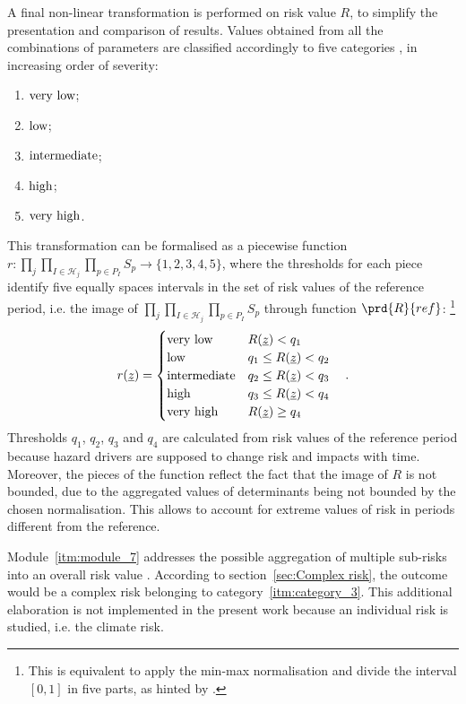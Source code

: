 A final non-linear transformation is performed on \gls{risk} value $R$, to simplify the presentation and comparison of results.
Values obtained from all the combinations of parameters are classified accordingly to five categories \cite[53]{2017GIZRiskSupplement}, in increasing order of severity:
\begin{enumerate}
  \item $\text{very low}$;
  \item $\text{low}$;
  \item $\text{intermediate}$;
  \item $\text{high}$;
  \item $\text{very high}$.
\end{enumerate}
This transformation can be formalised as a piecewise function $r : \prod_j \prod_{I \in \mathcal{H}_j} \prod_{p \in P_I} S_p \to \{ 1, 2, 3, 4, 5 \}$, where the thresholds for each piece identify five equally spaces intervals in the set of risk values of the reference period, i.e. the image of $\prod_j \prod_{I \in \mathcal{H}_j} \prod_{p \in P_I} S_p$ through function $\prd{R}{ref}$:%
\footnote{This is equivalent to apply the min-max normalisation and divide the interval $[0, 1]$ in five parts, as hinted by \cite[74]{2017GIZVulnerabilitySourcebook}.}
\begin{equation}
  \label{eq:risk_categorical}
  r(\underline{z}) =
  \begin{cases}
    \text{very low} & R(\underline{z}) < q_1 \\
    \text{low} & q_1 \le R(\underline{z}) < q_2 \\
    \text{intermediate} & q_2 \le R(\underline{z}) < q_3 \\
    \text{high} & q_3 \le R(\underline{z}) < q_4 \\
    \text{very high} & R(\underline{z}) \ge q_4
  \end{cases}
  \quad .
\end{equation}
Thresholds $q_1$, $q_2$, $q_3$ and $q_4$ are calculated from risk values of the reference period because \gls{hazard} \glspl{driver} are supposed to change risk and \glspl{impact} with time. Moreover, the pieces of the function reflect the fact that the image of $R$ is not bounded, due to the aggregated values of \glspl{determinant} being not bounded by the chosen normalisation. This allows to account for extreme values of risk in periods different from the reference.

Module~\ref{itm:module_7} addresses the possible aggregation of multiple sub-risks into an overall \gls{risk} value \cite[54]{2017GIZRiskSupplement}. According to section~\ref{sec:Complex risk}, the outcome would be a complex risk belonging to category~\ref{itm:category_3}.
This additional elaboration is not implemented in the present work because an individual \gls{risk} is studied, i.e. the climate risk.
